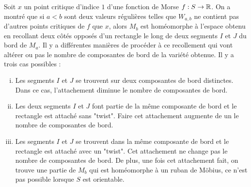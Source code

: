 Soit $x$ un point critique d'indice $1$ d'une fonction de Morse $f:S\to\operatorname{\mathbb R}$. 
On a montré que si $a<b$ sont deux valeurs régulières telles que $W_{a,b}$ ne contient pas 
d'autres points critiques de $f$ que $x$, alors $M_b$ est homéomorphe à l'espace obtenu en 
recollant deux côtés opposés d'un rectangle le long de deux segments $I$ et $J$ du bord de $M_a$. 
Il y a différentes manières de procéder à ce recollement qui vont altérer ou pas le nombre de 
composantes de bord de la variété obtenue. 
Il y a trois cas possibles :
\begin{enumerate}[(i)]
    \item Les segments $I$ et $J$ se trouvent sur deux composantes de bord distinctes. 
    Dans ce cas, l'attachement diminue le nombre de composantes de bord.
    \item Les deux segments $I$ et $J$ font partie de la même composante de bord et le rectangle
    est attaché sans "twist". 
    Faire cet attachement augmente de un le nombre de composantes de bord.
    \item Les segments $I$ et $J$ se trouvent dans la même composante de bord et le 
    rectangle est attaché avec un "twist". 
    Cet attachement ne change pas le nombre de composantes de bord. De plus, une fois cet 
    attachement fait, on trouve une partie de $M_b$ qui est homéomorphe à un ruban de Möbius, 
    ce n'est pas possible lorsque $S$ est orientable.
\end{enumerate}